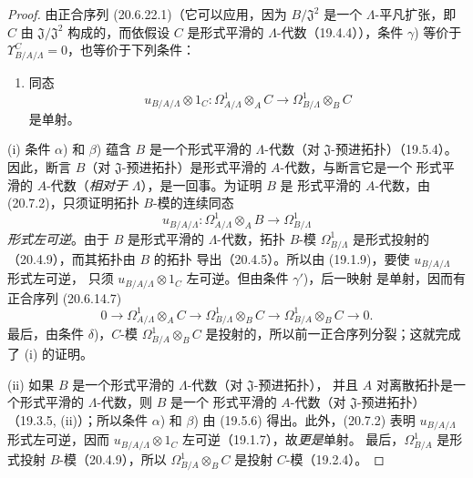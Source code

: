 \begin{proof}
由正合序列 (20.6.22.1)（它可以应用，因为 $B/\mathfrak J^2$ 是一个
$\Lambda$-平凡扩张，即 $C$ 由 $\mathfrak J/\mathfrak J^2$ 构成的，而依假设
$C$ 是形式平滑的 $\Lambda$-代数（19.4.4）），条件 $\gamma$) 等价于
$\Upsilon^C_{B/A/\Lambda}=0$，也等价于下列条件：
\begin{enumerate}
  \item[$\gamma'$)] 同态
  \[
    u_{B/A/\Lambda}\otimes 1_C:
    \Omega^1_{A/\Lambda}\otimes_A C
    \longrightarrow \Omega^1_{B/\Lambda}\otimes_B C
  \]
  是单射。
\end{enumerate}

(i) 条件 $\alpha$) 和 $\beta$) 蕴含 $B$ 是一个形式平滑的
$\Lambda$-代数（对 $\mathfrak J$-预进拓扑）（19.5.4）。因此，断言 $B$（对
$\mathfrak J$-预进拓扑）是形式平滑的 $A$-代数，与断言它是一个
形式平滑的 $A$-代数（\emph{相对于 $\Lambda$}），是一回事。为证明 $B$ 是
形式平滑的 $A$-代数，由 (20.7.2)，只须证明拓扑 $B$-模的连续同态
\[
  u_{B/A/\Lambda}:\Omega^1_{A/\Lambda}\otimes_A B
  \longrightarrow\Omega^1_{B/\Lambda}
\]
\emph{形式左可逆}。由于 $B$ 是形式平滑的 $\Lambda$-代数，拓扑 $B$-模
$\Omega^1_{B/\Lambda}$ 是形式投射的（20.4.9），而其拓扑由 $B$ 的拓扑
导出（20.4.5）。所以由 (19.1.9)，要使 $u_{B/A/\Lambda}$ 形式左可逆，
只须 $u_{B/A/\Lambda}\otimes 1_C$ 左可逆。但由条件 $\gamma'$)，后一映射
是单射，因而有正合序列 (20.6.14.7)
\[
  0\longrightarrow\Omega^1_{A/\Lambda}\otimes_A C
  \longrightarrow\Omega^1_{B/\Lambda}\otimes_B C
  \longrightarrow\Omega^1_{B/A}\otimes_B C\longrightarrow0.
\]
最后，由条件 $\delta$)，$C$-模
$\Omega^1_{B/A}\otimes_BC$ 是投射的，所以前一正合序列分裂；这就完成了
(i) 的证明。


(ii) 如果 $B$ 是一个形式平滑的 $\Lambda$-代数（对 $\mathfrak J$-预进拓扑），
并且 $A$ 对离散拓扑是一个形式平滑的 $\Lambda$-代数，则 $B$ 是一个
形式平滑的 $A$-代数（对 $\mathfrak J$-预进拓扑）（19.3.5, (ii)）；所以条件
$\alpha$) 和 $\beta$) 由 (19.5.6) 得出。此外，(20.7.2) 表明
$u_{B/A/\Lambda}$ 形式左可逆，因而
$u_{B/A/\Lambda}\otimes 1_C$ 左可逆（19.1.7），故\emph{更是}单射。
最后，$\Omega^1_{B/A}$ 是形式投射 $B$-模（20.4.9），所以
$\Omega^1_{B/A}\otimes_BC$ 是投射 $C$-模（19.2.4）。
\end{proof}

